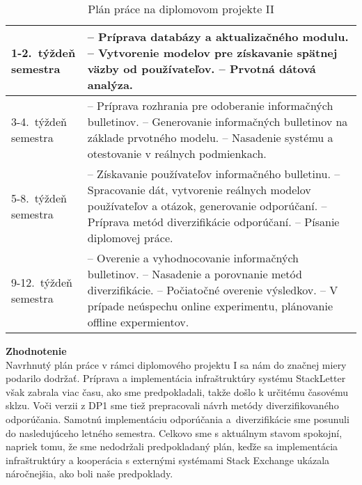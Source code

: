 \begin{table}[h]
\centering
\caption{Plán práce na diplomovom projekte II}
\begin{tabular}{|m{2.3cm}|m{12cm}|}
\hline
1-2.~týždeň semestra   & -- Príprava databázy a aktualizačného modulu.
				\newline -- Vytvorenie modelov pre získavanie spätnej väzby od používateľov.
				\newline -- Prvotná dátová analýza.
				\\ \hline
3-4.~týždeň semestra   & -- Príprava rozhrania pre odoberanie informačných bulletinov.
				\newline -- Generovanie informačných bulletinov na základe prvotného modelu.
				\newline -- Nasadenie systému a otestovanie v reálnych podmienkach.
				\\ \hline
5-8.~týždeň semestra   & -- Získavanie používateľov informačného bulletinu.
				\newline -- Spracovanie dát, vytvorenie reálnych modelov používateľov a otázok, generovanie odporúčaní.
				\newline -- Príprava metód diverzifikácie odporúčaní.
				\newline -- Písanie diplomovej práce.
				\\ \hline
9-12.~týždeň semestra  & -- Overenie a vyhodnocovanie informačných bulletinov.
				\newline -- Nasadenie a porovnanie metód diverzifikácie.
				\newline -- Počiatočné overenie výsledkov.
				\newline -- V prípade neúspechu online experimentu, plánovanie offline expermientov.
				\\ \hline
\end{tabular}
\end{table}

\textbf{Zhodnotenie}\\
Navrhnutý plán práce v rámci diplomového projektu I sa nám do značnej miery podarilo dodržať. Príprava a implementácia
infraštruktúry systému StackLetter však zabrala viac času, ako sme predpokladali, takže došlo k určitému časovému sklzu.
Voči verzii z DP1 sme tiež prepracovali návrh metódy diverzifikovaného odporúčania. Samotnú implementáciu
odporúčania a~diverzifikácie sme posunuli do nasledujúceho letného semestra. Celkovo sme s aktuálnym stavom spokojní,
napriek tomu, že sme nedodržali predpokladaný plán, keďže sa implementácia infraštruktúry a kooperácia s externými
systémami Stack Exchange ukázala náročnejšia, ako boli naše predpoklady.

